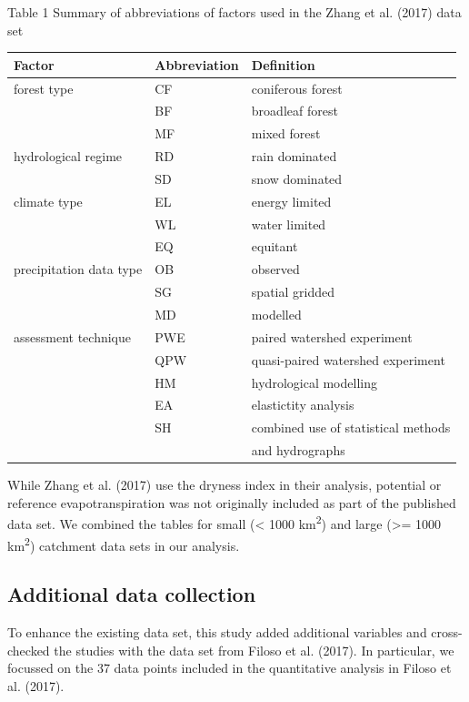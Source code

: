 \documentclass[]{elsarticle} %
\begin{document}
Table 1 Summary of abbreviations of factors used in the Zhang et al. (2017) data set

\begin{longtable}[]{@{}lll@{}}
\toprule
Factor & Abbreviation & Definition \\
\midrule
\endhead
forest type & CF & coniferous forest \\
& BF & broadleaf forest \\
& MF & mixed forest \\
hydrological regime & RD & rain dominated \\
& SD & snow dominated \\
climate type & EL & energy limited \\
& WL & water limited \\
& EQ & equitant \\
precipitation data type & OB & observed \\
& SG & spatial gridded \\
& MD & modelled \\
assessment technique & PWE & paired watershed experiment \\
& QPW & quasi-paired watershed experiment \\
& HM & hydrological modelling \\
& EA & elastictity analysis \\
& SH & combined use of statistical methods \\
& & and hydrographs \\
\bottomrule
\end{longtable}

While Zhang et al. (2017) use the dryness index in their analysis, potential or reference evapotranspiration was not originally included as part of the published data set.
We combined the tables for small (\textless{} 1000 km\textsuperscript{2}) and large (\textgreater= 1000 km\textsuperscript{2}) catchment data sets in our analysis.

\hypertarget{additional-data-collection}{%
\subsection{Additional data collection}\label{additional-data-collection}}

To enhance the existing data set, this study added additional variables and cross-checked the studies with the data set from Filoso et al. (2017). In particular, we focussed on the 37 data points included in the quantitative analysis in Filoso et al. (2017).
\end{document}
